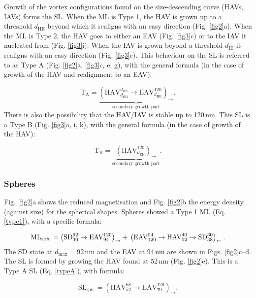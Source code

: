 \documentclass[review,authoryear]{elsarticle}
\newcommand{\dmax}{d_\text{max}}
\newcommand{\nm}{\,\text{nm}}
\begin{document}
Growth of the vortex configurations found on the size-descending curve (HAVs, IAVs) forms the SL. When the ML is Type 1, the HAV is grown up to a threshold $d_\text{HE}$ beyond which it realigns with an easy direction (Fig. \ref{fig2}a). When the ML is Type 2, the HAV goes to either an EAV (Fig. \ref{fig3}c) or to the IAV it nucleated from (Fig. \ref{fig3}i). When the IAV is grown beyond a threshold $d_\text{IE}$ it realigns with an easy direction (Fig. \ref{fig3}c). This behaviour on the SL is referred to as Type A (Fig. \ref{fig2}a, \ref{fig3}c, e, g), with the general formula (in the case of growth of the HAV and realignment to an EAV):
{\par\nobreak\noindent}
\begin{equation}\label{typeA}
\text{T}_{\text{A}}=\underbrace{\left(\text{HAV}_{d_{\text{EH}}}^{d_{\text{HE}}}\rightarrow\text{EAV}_{d_{\text{HE}}}^{120}\right)_{\rightarrow}}_\text{secondary growth part}.
\end{equation}
There is also the possibility that the HAV/IAV is stable up to 120$\nm$. This SL is a Type B (Fig. \ref{fig3}a, i, k), with the general formula (in the case of growth of the HAV):
{\par\nobreak\noindent}
\begin{equation}\label{typeB}
\text{T}_{\text{B}}=\underbrace{\left(\text{HAV}_{d_{\text{EH}}}^{120}\right)_{\rightarrow}}_\text{secondary growth part}.
\end{equation}
\par

\subsubsection{Spheres}
Fig. \ref{fig2}a shows the reduced magnetisation and Fig. \ref{fig2}b the energy density (against size) for the spherical shapes. Spheres showed a Type 1 ML (Eq. \ref{type1}), with a specific formula:
{\par\nobreak\noindent}
\begin{equation}
\text{ML}_{\text{sph.}}=\left(\text{SD}_{30}^{92}\rightarrow\text{EAV}_{94}^{120}\right)_{\rightarrow} + \\
\left(\text{EAV}_{120}^{54}\rightarrow\text{HAV}_{52}^{40}\rightarrow\text{SD}_{38}^{30}\right)_{\leftarrow}.
\end{equation}
The SD state at $\dmax=92\,\text{nm}$ and the EAV at 94$\nm$ are shown in Figs. \ref{fig2}c--d. The SL is formed by growing the HAV found at 52$\nm$ (Fig. \ref{fig2}e). This is a Type A SL (Eq. \ref{typeA}), with formula:
{\par\nobreak\noindent}
\begin{equation}
\text{SL}_{\text{sph.}}=\left(\text{HAV}_{52}^{68}\rightarrow\text{EAV}_{70}^{120}\right)_{\rightarrow}.
\end{equation}
\par
\end{document}
